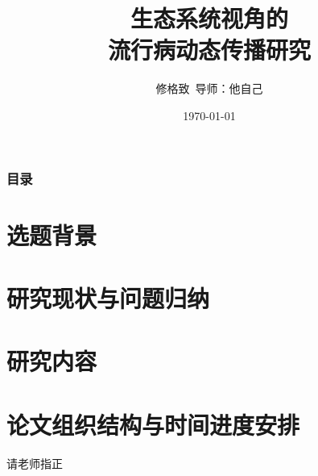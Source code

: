 \documentclass{beamer}
\title[Urban Ecosystem]{生态系统视角的\\流行病动态传播研究}
\author{修格致\ 导师：他自己}
\institute[北大遥感所]{北京大学遥感与地理信息系统研究所\\
    \medskip
    \textit{xiugz@pku.edu.com}}
\date{\today}
\begin{document}
\begin{frame}
\titlepage
\end{frame}

\begin{frame}
\frametitle{目录}
\tableofcontents
\end{frame}

\section{选题背景}

\section{研究现状与问题归纳}

\section{研究内容}

\section{论文组织结构与时间进度安排}


\begin{frame}
\Huge{\centerline{请老师指正}}
\end{frame}


\end{document}
